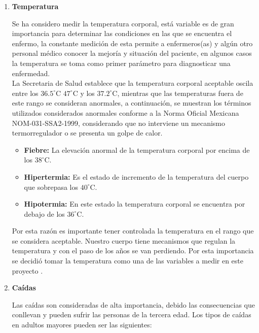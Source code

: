 \begin{enumerate}
	\item \textbf{Temperatura} 
	
	Se ha considero medir la temperatura corporal, está variable es de gran importancia para determinar las condiciones en las que se encuentra el enfermo, la constante medición de esta permite a enfermeros(as) y algún otro personal médico conocer la mejoría y situación del paciente, en algunos casos la temperatura se toma como primer parámetro para diagnosticar una enfermedad. \\
	
	La Secretaria de Salud establece que la temperatura corporal aceptable oscila entre los $36.5^{\circ}$C $47^{\circ}$C y los $37.2^{\circ}$C, mientras que las temperaturas fuera de este rango se consideran anormales, a continuación, se muestran los términos utilizados considerados anormales conforme a la Norma Oficial Mexicana NOM-031-SSA2-1999, considerando que no interviene un mecanismo termorregulador o se presenta un golpe de calor.
	
	\begin{itemize}
		\item \textbf{Fiebre:} La elevación anormal de la temperatura corporal por encima de los $38^{\circ}$C.
		\item \textbf{Hipertermia:} Es el estado de incremento de la temperatura del cuerpo que sobrepasa los $40^{\circ}$C.
		\item \textbf{Hipotermia:} En este estado la temperatura corporal se encuentra por debajo de los $36^{\circ}$C.
	\end{itemize}
	
	Por esta razón es importante tener controlada la temperatura en el rango que se considera aceptable. Nuestro cuerpo tiene mecanismos que regulan la temperatura y con el paso de los años se van perdiendo. Por esta importancia se decidió tomar la temperatura como una de las variables a medir en este proyecto \cite{once}.
	
	\item \textbf{Caídas}
	
	Las caídas son consideradas de alta importancia, debido las consecuencias que conllevan y pueden sufrir las personas de la tercera edad. Los tipos de caídas en adultos mayores pueden ser las siguientes:
	

\end{enumerate}
